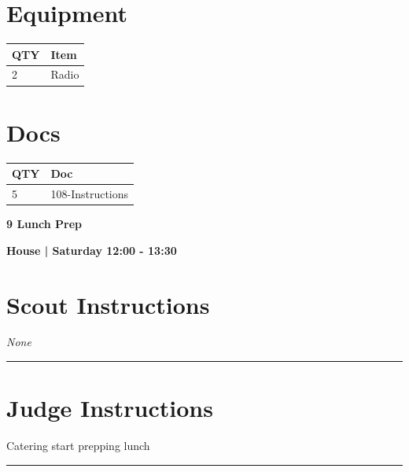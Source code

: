 \documentclass[10pt]{article}
\newcommand{\newtitle}[1]{\begin{center}{\Huge\bfseries #1 }\\ \vspace{5mm}\end{center}}
\newcommand{\newsubtitle}[1]{\begin{center}{\color{grey}\Large\bfseries #1 }\\ \vspace{5mm}\end{center}}
\begin{document}
	\begin{multicols}{2}

		\section*{\faWrench \: Equipment}

		
	\begin{center}
			\begin{tabular}{p{2cm}p{4cm}}


				\textbf{QTY} & \textbf{Item} \\\toprule
												2&Radio\\\midrule
								\end{tabular}

			\end{center}

		
		\vfill\null
		\columnbreak

			\section*{\faFile \: Docs}
		 	\begin{center}
			\begin{tabular}{p{2cm}p{4cm}}

			\textbf{QTY} & \textbf{Doc} \\\toprule
										5&108-Instructions\\\midrule
							\end{tabular}
			\end{center}
	

		\vfill\null

		\end{multicols}



	\vspace{1cm}


	\clearpage
		\newtitle{9 Lunch Prep }
	\newsubtitle{House | Saturday 12:00 - 13:30}
		\setcounter{section}{8}
	\section*{Scout Instructions}
		\textit{None}
	
	\vspace{0.5cm}
	\hrule
	\vspace{0.5cm}

		\section*{Judge Instructions}
		Catering start prepping lunch
\vspace{0.5cm}
	\hrule
	\vspace{0.5cm}
\end{document}

